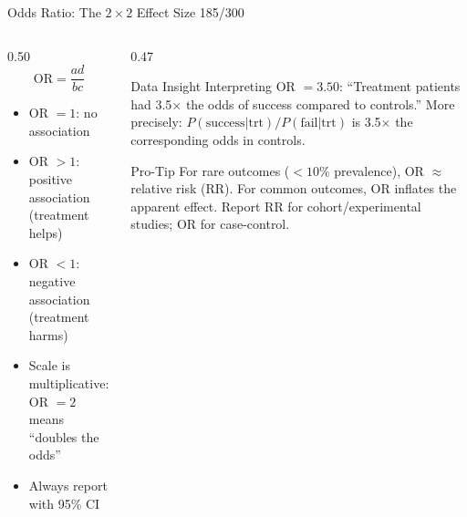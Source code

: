\documentclass[10pt]{beamer}
\newcommand{\smark}[1]{\hfill{\scriptsize\color{codegray}#1}}
\begin{document}
\begin{frame}{Odds Ratio: The $2 \times 2$ Effect Size}
\smark{185/300}
\begin{columns}[T]
\begin{column}{0.50\textwidth}
$$\text{OR} = \frac{ad}{bc}$$
\begin{itemize}
    \item OR $= 1$: no association
    \item OR $> 1$: positive association (treatment helps)
    \item OR $< 1$: negative association (treatment harms)
    \item Scale is multiplicative: OR $= 2$ means ``doubles the odds''
    \item Always report with 95\% CI
\end{itemize}
\end{column}
\begin{column}{0.47\textwidth}
\begin{exampleblock}{Data Insight}
    \scriptsize Interpreting OR $= 3.50$: ``Treatment patients had 3.5$\times$ the odds of success compared to controls.'' More precisely: $P(\text{success}|\text{trt}) / P(\text{fail}|\text{trt})$ is 3.5$\times$ the corresponding odds in controls.
\end{exampleblock}
\vspace{0.1cm}
\begin{alertblock}{Pro-Tip}
    \scriptsize For rare outcomes ($< 10\%$ prevalence), OR $\approx$ relative risk (RR). For common outcomes, OR inflates the apparent effect. Report RR for cohort/experimental studies; OR for case-control.
\end{alertblock}
\end{column}
\end{columns}
\end{frame}
\end{document}
